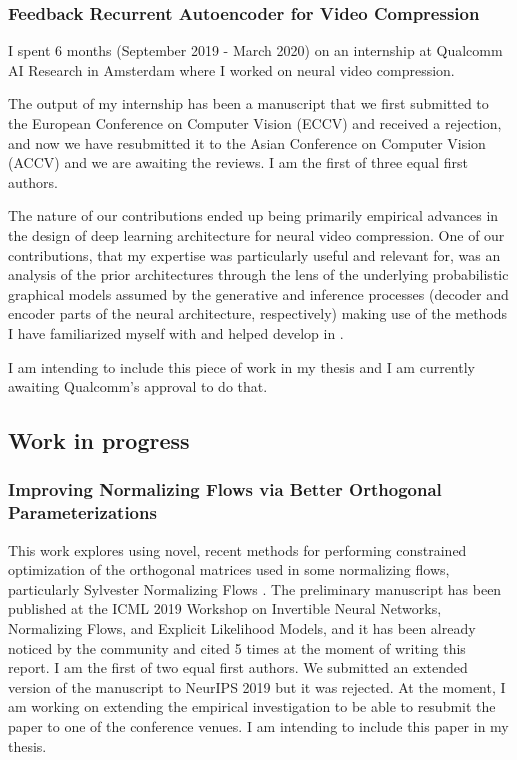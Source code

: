 \documentclass[12pt]{article}
\begin{document}
\subsubsection{Feedback Recurrent Autoencoder for Video Compression}%
I spent 6 months (September 2019 - March 2020) on an internship at Qualcomm AI Research in Amsterdam where I worked on neural video compression.

The output of my internship has been a manuscript that we first submitted to the European Conference on Computer Vision (ECCV) and received a rejection, and now we have resubmitted it to the Asian Conference on Computer Vision (ACCV) and we are awaiting the reviews.
I am the first of three equal first authors.

The nature of our contributions ended up being primarily empirical advances in the design of deep learning architecture for neural video compression.
One of our contributions, that my expertise was particularly useful and relevant for, was an analysis of the prior architectures through the lens of the underlying probabilistic graphical models assumed by the generative and inference processes (decoder and encoder parts of the neural architecture, respectively) making use of the methods I have familiarized myself with and helped develop in \citep{Webb2018faithful}.

I am intending to include this piece of work in my thesis and I am currently awaiting Qualcomm's approval to do that.


\subsection{Work in progress}

\subsubsection{Improving Normalizing Flows via Better Orthogonal Parameterizations}%
This work explores using novel, recent methods for performing constrained optimization of the orthogonal matrices \citep{Lezcano2019exprnn} 
used in some normalizing flows, particularly Sylvester Normalizing Flows \citep{vandenBerg2018sylvester}.
The preliminary manuscript has been published at the ICML 2019 Workshop on Invertible Neural Networks, Normalizing Flows, and Explicit Likelihood Models, and it has been already noticed by the community and cited 5 times at the moment of writing this report.
I am the first of two equal first authors.
We submitted an extended version of the manuscript to NeurIPS 2019 but it was rejected.
At the moment, I am working on extending the empirical investigation to be able to resubmit the paper to one of the conference venues.
I am intending to include this paper in my thesis. 
\end{document}
